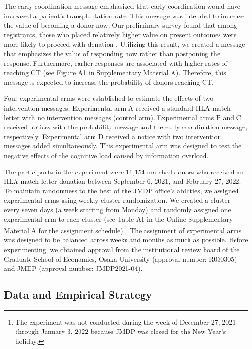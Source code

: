 \documentclass[12pt, a4paper]{article}
\begin{document}
The early coordination message emphasized that early coordination would have increased a patient's transplantation rate. This message was intended to increase the value of becoming a donor now. Our preliminary survey found that among registrants, those who placed relatively higher value on present outcomes were more likely to proceed with donation \citep{Ohtake2020}. Utilizing this result, we created a message that emphasizes the value of responding now rather than postponing the response. Furthermore, earlier responses are associated with higher rates of reaching CT (see Figure A1 in Supplementary Material A). Therefore, this message is expected to increase the probability of donors reaching CT.

Four experimental arms were established to estimate the effects of two intervention messages. Experimental arm A received a standard HLA match letter with no intervention messages (control arm). Experimental arms B and C received notices with the probability message and the early coordination message, respectively. Experimental arm D received a notice with two intervention messages added simultaneously. This experimental arm was designed to test the negative effects of the cognitive load caused by information overload.

The participants in the experiment were 11,154 matched donors who received an HLA match letter donation between September 6, 2021, and February 27, 2022. To maintain randomness to the best of the JMDP office's abilities, we assigned experimental arms using weekly cluster randomization. We created a cluster every seven days (a week starting from Monday) and randomly assigned one experimental arm to each cluster (see Table A1 in the Online Supplementary Material A for the assignment schedule).\footnote{The experiment was not conducted during the week of December 27, 2021 through January 3, 2022 because JMDP was closed for the New Year's holiday.} The assignment of experimental arms was designed to be balanced across weeks and months as much as possible. Before experimenting, we obtained approval from the institutional review board of the Graduate School of Economics, Osaka University (approval number: R030305) and JMDP (approval number: JMDP2021-04).

\hypertarget{data-and-empirical-strategy}{%
\subsection{Data and Empirical Strategy}\label{data-and-empirical-strategy}}
\end{document}
